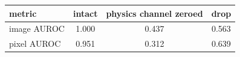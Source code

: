 \setlength{\tabcolsep}{3pt}
\begin{tabular}{@{}lccc@{}}
\toprule
metric & intact & physics channel zeroed & drop \\
\midrule
image AUROC & 1.000 & 0.437 & 0.563 \\
pixel AUROC & 0.951 & 0.312 & 0.639 \\
\bottomrule
\end{tabular}
